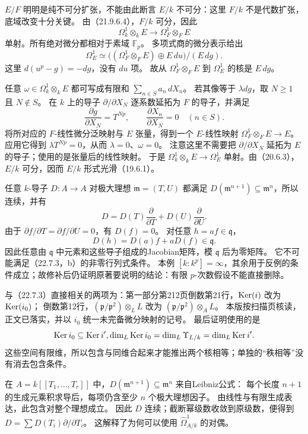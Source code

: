 $E/F$ 明明是纯不可分扩张，不能由此断言 $E/k$ 不可分：这里 $F/k$ 不是代数扩张，底域改变十分关键。
由（21.9.6.4），$F/k$ 可分，因此
\[
 \Omega^1_k\otimes_kE\longrightarrow\Omega^1_F\otimes_FE
\]
单射。所有绝对微分都相对于素域 $\mathbb F_p$。
多项式商的微分表示给出
\[
 \Omega^1_E\simeq
 \bigl((\Omega^1_F\otimes_FE)\oplus E\,du\bigr)/(E\,dg).
\]
这里 $d(u^p-g)=-dg$，没有 $du$ 项。
故从 $\Omega^1_F\otimes_FE$ 到 $\Omega^1_E$ 的核是 $E\,dg$。

任意 $\omega\in\Omega^1_k\otimes_kE$ 都可写成有限和 $\sum_{n\in S}a_n\,dX_n$。
若其像等于 $\lambda dg$，取 $N\ge1$ 且 $N\notin S$。
在 $k$ 上的导子 $\partial/\partial X_N$ 逐系数延拓为 $F$ 的导子，并满足
\[
 \frac{\partial g}{\partial X_N}=T^{Np},\qquad
 \frac{\partial X_n}{\partial X_N}=0\quad(n\in S).
\]
将所对应的 $F$-线性微分泛映射与 $E$ 张量，得到一个 $E$-线性映射
$\Omega^1_F\otimes_FE\to E$。
应用它得到 $\lambda T^{Np}=0$，从而 $\lambda=0$、$\omega=0$。
注意这里不需要把 $\partial/\partial X_N$ 延拓为 $E$ 的导子；使用的是张量后的线性映射。
于是 $\Omega^1_k\otimes_kE\to\Omega^1_E$ 单射。由（20.6.3），$E/k$ 可分，因而 $E/k$ 形式光滑（19.6.1）。

任意 $k$-导子 $D:A\to A$ 对极大理想 $\mathfrak m=(T,U)$ 都满足
$D(\mathfrak m^{n+1})\subseteq\mathfrak m^n$，所以连续，并有
\[
 D=D(T)\frac{\partial}{\partial T}+D(U)\frac{\partial}{\partial U}.
\]
由于 $\partial f/\partial T=\partial f/\partial U=0$，有 $D(f)=0$。
对任意 $h=af\in\mathfrak q$，
\[
 D(h)=D(a)f+aD(f)\in\mathfrak q.
\]
因此任意由 $\mathfrak q$ 中元素和这些导子组成的Jacobian矩阵，模 $\mathfrak q$ 后为零矩阵。
它不可能满足（22.7.3，b）的非零行列式条件。
本例 $[k:k^p]=\infty$，其余用于反例的条件成立；故修补后仍证明原著要说明的结论：有限 $p$-次数假设不能直接删除。

与（22.7.3）直接相关的两项为：第一部分第212页倒数第21行，$\operatorname{Ker}(i)$ 改为 $\operatorname{Ker}(i_0)$；
倒数第12行，$(\mathfrak p/\mathfrak p^2)\otimes_LL$ 改为 $(\mathfrak p/\mathfrak p^2)\otimes_AL$。
本版按扫描页核读，正文已落实，并以 $i_0$ 统一未完备微分映射的记号。
最后证明使用的是
\[
 \operatorname{Ker} i_0\subseteq\operatorname{Ker} i',
 \dim_L\operatorname{Ker} i_0=\dim_L\Upsilon_{L/k}=\dim_L\operatorname{Ker} i'.
\]
这些空间有限维，所以包含与同维合起来才能推出两个核相等；单独的“秩相等”没有消去包含条件。

在 $A=k[[T_1,\ldots,T_r]]$ 中，$D(\mathfrak m^{n+1})\subseteq\mathfrak m^n$ 来自Leibniz公式：
每个长度 $n+1$ 的生成元乘积求导后，每项仍含至少 $n$ 个极大理想因子。
由线性与有限生成表达，此包含对整个理想成立。
因此 $D$ 连续；截断幂级数收敛到原级数，便得到 $D=\sum D(T_i)\partial/\partial T_i$。
这解释了为何可以使用 $\widehat\Omega^1_{A/k}$ 的对偶。

